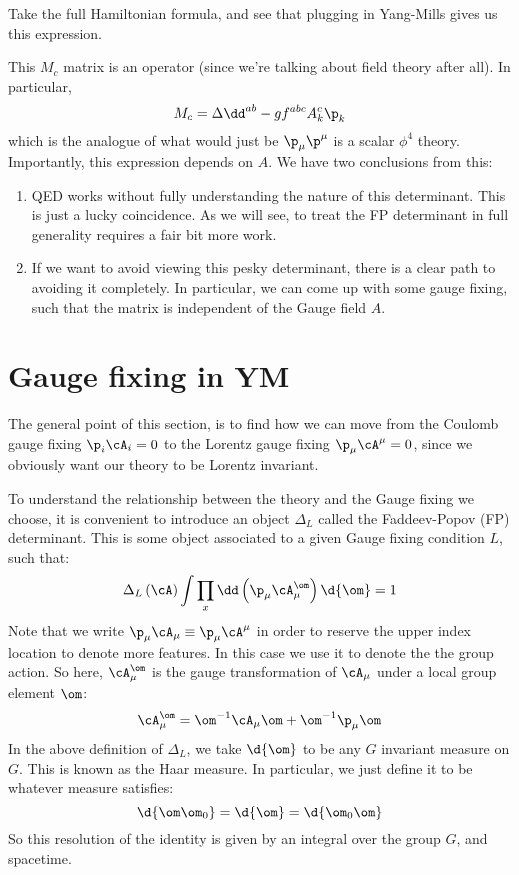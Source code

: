 \documentclass{booc}
\begin{document}
\begin{exr}
Take the full Hamiltonian formula, and see that plugging in 
Yang-Mills gives us this expression.
\end{exr}

This $M_c$ matrix is an operator (since we're talking about field theory after all).
In particular, 
\begin{equation}
M_c = \Delta \dd^{ab} - g f^{abc} A^c_k \p_k
\end{equation}
which is the analogue of what would just be $\p_\mu\p^\mu$ is a scalar $\phi^4$ theory.
Importantly, this expression depends on $A$. 
We have two conclusions from this:
\begin{enumerate}
\item QED works without fully understanding the nature of this determinant. This is 
just a lucky coincidence. As we will see, to treat the FP determinant in full generality
requires a fair bit more work. 
\item If we want to avoid viewing this pesky determinant, 
there is a clear path to avoiding it completely. 
In particular, we can come up with some gauge fixing, 
such that the matrix is independent of the Gauge field $A$.
\end{enumerate}

\section{Gauge fixing in YM}

The general point of this section, is to find
how we can move from the Coulomb gauge fixing $\p_i \cA_i = 0$
to the Lorentz gauge fixing $\p_\mu \cA^\mu = 0$, since we obviously
want our theory to be Lorentz invariant.

To understand the relationship between the theory and the Gauge fixing
we choose, it is convenient to introduce an object $\Delta_L$
called the Faddeev-Popov (FP) determinant. This is some object associated to 
a given Gauge fixing condition $L$, such that:
\begin{equation}
\Delta_L\left( \cA \right) 
\int \prod_x \dd\left( \p_\mu \cA_\mu^\om \right)\d{\om} = 1
\end{equation}
Note that we write $\p_\mu \cA_\mu \equiv \p_\mu \cA^\mu$ in order to reserve the
upper index location to denote more features. In this case we use it to denote the 
the group action. 
So here, $\cA_\mu^\om$ is the gauge transformation of $\cA_\mu$
under a local group element $\om$:
\begin{equation}
\cA_\mu^\om = \om^{-1} \cA_\mu \om + \om^{-1} \p_\mu \om
\end{equation}
In the above definition of $\Delta_L$, we take $\d{\om}$ to be any
$G$ invariant measure on $G$. This is known as the Haar measure. 
In particular, we just define it to be whatever measure satisfies:
\begin{equation}
\d{\om \om_0} = \d{\om} = \d{\om_0 \om}
\end{equation}
So this resolution of the identity is given by an integral over the group $G$, 
and spacetime.
\end{document}
